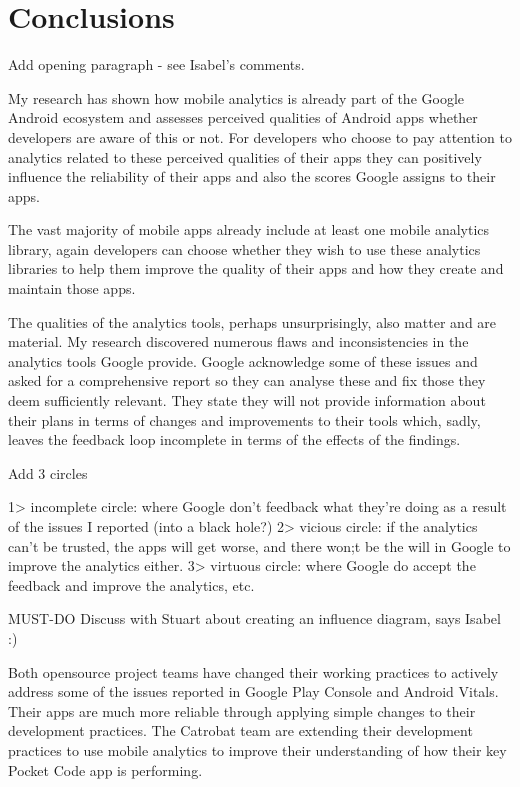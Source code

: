 \chapter{Conclusions}
\label{chapter-conclusions}

Add opening paragraph - see Isabel's comments. 

My research has shown how mobile analytics is already part of the Google Android ecosystem and assesses perceived qualities 
of Android apps whether developers are aware of this or not. For developers who choose to pay attention to analytics related to these perceived qualities of their apps they can positively influence the reliability of their apps and also the scores Google assigns to their apps. 

The vast majority of mobile apps already include at least one mobile analytics library, again developers can choose whether they wish to use these analytics libraries to help them improve the quality of their apps and how they create and maintain those apps. 

The qualities of the analytics tools, perhaps unsurprisingly, also matter and are material. My research discovered numerous flaws and inconsistencies in the analytics tools Google provide. Google acknowledge some of these issues and asked for a comprehensive report so they can analyse these and fix those they deem sufficiently relevant. They state they will not provide information about their plans in terms of changes and improvements to their tools which, sadly, leaves the feedback loop incomplete in terms of the effects of the findings.

Add 3 circles 

1> incomplete circle: where Google don't feedback what they're doing as a result of the issues I reported (into a black hole?)
2> vicious circle: if the analytics can't be trusted, the apps will get worse, and there won;t be the will in Google to improve the analytics either.
3> virtuous circle: where Google do accept the feedback and improve the analytics, etc. 

MUST-DO Discuss with Stuart about creating an influence diagram, says Isabel :) 

Both opensource project teams have changed their working practices to actively address some of the issues reported in Google Play Console and Android Vitals. Their apps are much more reliable through applying simple changes to their development practices. The Catrobat team are extending their development practices to use mobile analytics to improve their understanding of how their key Pocket Code app is performing.


